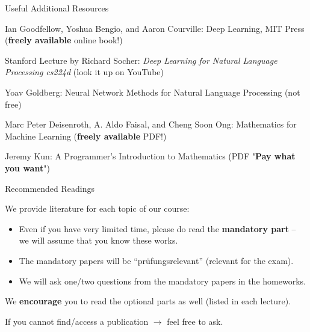 \documentclass[12pt]{beamer}
\begin{document}
\begin{frame}{Useful Additional Resources}

Ian Goodfellow, Yoshua Bengio, and Aaron Courville: Deep Learning, MIT Press (\textbf{freely available} online book!)

Stanford Lecture by Richard Socher: \emph{Deep Learning for Natural Language Processing cs224d} (look it up on YouTube)
	
Yoav Goldberg: Neural Network Methods for Natural Language Processing (not free)

Marc Peter Deisenroth, A. Aldo Faisal, and Cheng Soon Ong: Mathematics for Machine Learning (\textbf{freely available} PDF!)
	
Jeremy Kun: A Programmer's Introduction to Mathematics (PDF "\textbf{Pay what you want}")

\end{frame}


\begin{frame}{Recommended Readings}

We provide literature for each topic of our course:

\begin{itemize}
	\item Even if you have very limited time, please do read the \textbf{mandatory part} -- we will assume that you know these works.
	\item The mandatory papers
	will be ``prüfungsrelevant'' (relevant for the exam).
	\item We will ask one/two questions from the mandatory papers in the homeworks.
\end{itemize}

We \textbf{encourage} you to read the optional parts as well (listed in each lecture).

If you cannot find/access a publication $\to$ feel free to ask.

\end{frame}
\end{document}
